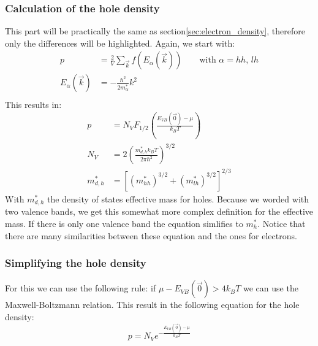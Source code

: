 \subsubsection{Calculation of the hole density}
This part will be practically the same as section\ref{sec:electron_density}, therefore only the differences will be highlighted.
Again, we start with:
\begin{align}
	p &= \frac{2}{V}\sum_{\vec{k}}^{}f(E_{\alpha}(\vec{k})) \qquad \text{with } \alpha = hh,\, lh \\
	E_{\alpha}(\vec{k}) &= -\frac{\hbar^2}{2m_{\alpha}^*}k^2 \\
\end{align}
This results in:
\begin{align}
	p &= N_V F_{1/2}\left(\frac{E_{VB}(\vec{0}) - \mu}{k_BT}\right) \\
	N_V &= 2\left(\frac{m_{d,h}^*k_BT}{2\pi\hbar^2}\right)^{3/2} \label{eqn:n_v} \\
	m_{d,h}^* &= \left[(m_{hh}^*)^{3/2} + (m_{lh}^*)^{3/2}\right]^{2/3}
\end{align}
With $m_{d,h}^*$ the density of states effective mass for holes. Because we worded with two valence bands, we get this somewhat more complex definition for the effective mass. If there is only one valence band the equation simlifies to $m_h^*$. Notice that there are many similarities between these equation and the ones for electrons.

\subsubsection{Simplifying the hole density}
For this we can use the following rule: if $ \mu -E_{VB}(\vec{0}) > 4k_BT $ we can use the Maxwell-Boltzmann relation. This result in the following equation for the hole density:
\begin{equation}
	p = N_Ve^{-\frac{E_{VB}(\vec{0}) - \mu}{k_BT}}
\end{equation}


